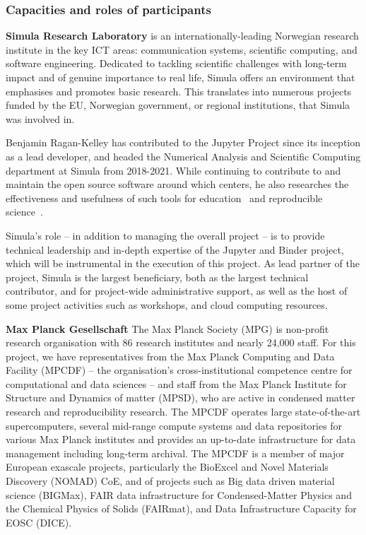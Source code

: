 \subsubsection{Capacities and roles of participants}

\noindent \textbf{Simula Research Laboratory}
 is an internationally-leading Norwegian research institute in the key
ICT areas: communication systems, scientific computing, and software
engineering. Dedicated to tackling scientific challenges with long-term impact and of
genuine importance to real life, Simula offers an environment that emphasises
and promotes basic research. This translates into numerous projects funded by
the EU, Norwegian government, or regional institutions, that Simula was
involved in.

Benjamin Ragan-Kelley has contributed to the Jupyter Project since its
inception as a lead developer, and headed the Numerical Analysis and
Scientific Computing department at Simula from 2018-2021.
While continuing to contribute to and maintain the
open source software around which \TheProject centers,
he also researches the effectiveness and usefulness of such tools for education~\cite{JupyterHub-for-education-2016}
and reproducible science~\cite{binder,Forde2018ReproducibleRE,nbval-arxiv,repo2docker-checker2020,Beg2021}.

Simula's role -- in addition to managing the overall project -- is to provide
technical leadership and in-depth expertise of the Jupyter and Binder project, which will be
instrumental in the execution of this project.
As lead partner of the project,
Simula is the largest beneficiary, both as the largest technical contributor,
and for project-wide administrative support,
as well as the host of some project activities such as workshops,
and cloud computing resources.

\noindent \textbf{Max Planck Gesellschaft}
The Max Planck Society (MPG) is non-profit research
organisation with 86 research institutes and nearly 24,000 staff. For this
project, we have representatives from the Max Planck Computing and Data
Facility (MPCDF) -- the organisation's cross-institutional competence centre
for computational and data sciences -- and staff from the Max Planck Institute
for Structure and Dynamics of matter (MPSD), who are active in condensed matter research and
reproducibility research.
%
The MPCDF operates large state-of-the-art supercomputers, several mid-range
compute systems and data repositories for various Max Planck institutes and
provides an up-to-date infrastructure for data management including long-term
archival.
The MPCDF is a member of major European exascale projects, particularly the
BioExcel and Novel Materials Discovery (NOMAD) CoE, and of projects
such as Big data driven material science (BIGMax), FAIR data infrastructure for
Condensed-Matter Physics and the Chemical Physics of Solids (FAIRmat), and Data
Infrastructure Capacity for EOSC (DICE).

